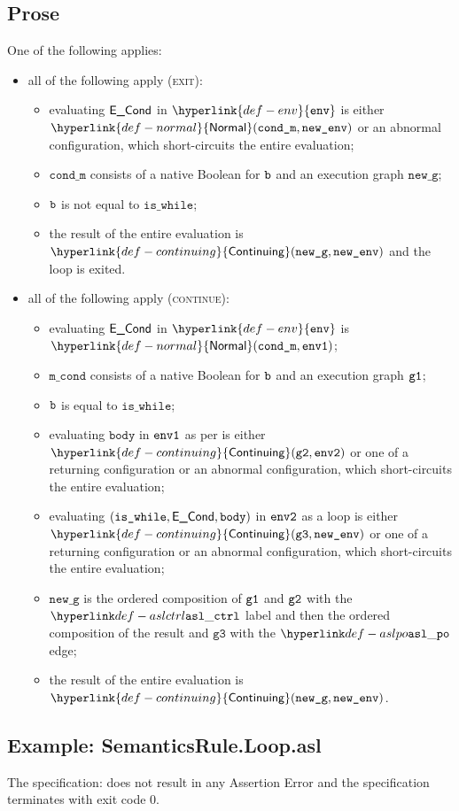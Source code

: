 \documentclass{book}
\newcommand\ProseOrAbnormal[0]{or an abnormal configuration, which short-circuits the entire evaluation}
\newcommand\Normal[0]{\hyperlink{def-normal}{\textsf{Normal}}}
\newcommand\Continuing[0]{\hyperlink{def-continuing}{\textsf{Continuing}}}
\newcommand\env[0]{\hyperlink{def-env}{\texttt{env}}}
\newcommand\newg[0]{\texttt{new\_g}}
\newcommand\vgthree[0]{\texttt{g3}}
\newcommand\mcond[0]{\texttt{m\_cond}}
\newcommand\vbody[0]{\texttt{body}}
\newcommand\iswhile[0]{\texttt{is\_while}}
\newcommand\econd[0]{\ECond}
\newcommand\condm[0]{\texttt{cond\_m}}
\begin{document}
\subsection{Prose}
One of the following applies:
\begin{itemize}
\item all of the following apply (\textsc{exit}):
  \begin{itemize}
    \item evaluating $\econd$ in $\env$ is either $\Normal(\condm, \newenv)$ \ProseOrAbnormal;
    \item $\condm$ consists of a native Boolean for $\texttt{b}$ and an execution graph $\newg$;
    \item $\texttt{b}$ is not equal to $\iswhile$;
    \item the result of the entire evaluation is $\Continuing(\newg, \newenv)$
    and the loop is exited.
  \end{itemize}
\item all of the following apply (\textsc{continue}):
  \begin{itemize}
    \item evaluating $\econd$ in $\env$ is $\Normal(\condm, \envone)$;
    \item $\mcond$ consists of a native Boolean for $\texttt{b}$ and an execution graph $\texttt{g1}$;
    \item $\texttt{b}$ is equal to $\iswhile$;
    \item evaluating $\vbody$ in $\texttt{env1}$ as per  is either
    $\Continuing(\vgtwo, \envtwo)$ or one of a returning configuration or an abnormal
    configuration, which short-circuits the entire evaluation;
    \item evaluating $(\iswhile, \econd, \vbody)$ in $\texttt{env2}$ as a loop is either \\
    $\Continuing(\vgthree, \newenv)$ or one of a returning configuration or an abnormal
    configuration, which short-circuits the entire evaluation;
    \item $\newg$ is the ordered composition of $\texttt{g1}$ and $\texttt{g2}$ with the $\aslctrl$ label
    and then the ordered composition of the result and $\vgthree$ with the $\aslpo$ edge;
    \item the result of the entire evaluation is $\Continuing(\newg, \newenv)$.
  \end{itemize}
\end{itemize}

    \subsection{Example: SemanticsRule.Loop.asl}
    The specification:
    does not result in any Assertion Error and the specification terminates with exit
    code $0$.
\end{document}
